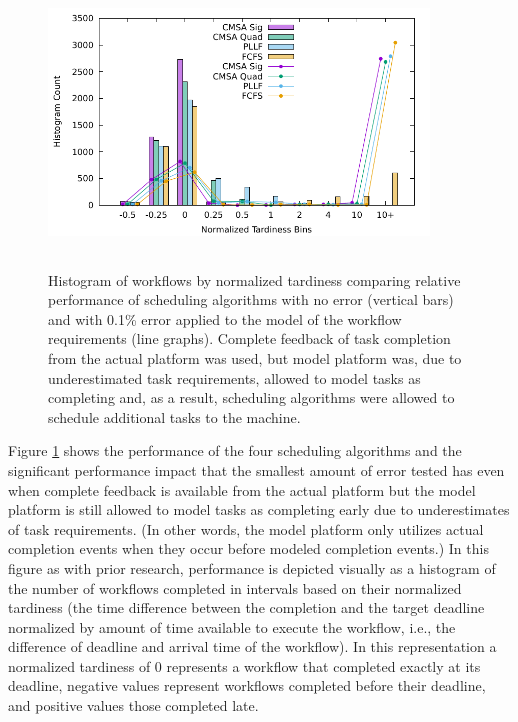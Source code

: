 \documentclass[10pt]{csce}
\begin{document}
\begin{figure}
	\begin{center}
		\includegraphics[width=0.9\textwidth,height=3in]{figures/Histogram_All_NoLoss_NoBias_LowAllError.pdf}
	\end{center}
	\caption{Histogram of workflows by normalized tardiness comparing
		relative performance of scheduling algorithms with no error (vertical
		bars) and with 0.1\% error applied to the model of the workflow
		requirements (line graphs).  Complete feedback of task completion from
		the actual platform was used, but model platform was, due to
		underestimated task requirements, allowed to model tasks as completing
		and, as a result, scheduling algorithms were allowed to schedule
		additional tasks to the machine.}
	\label{fig:noloss-nobias-lowerror}
\end{figure}

Figure \ref{fig:noloss-nobias-lowerror} shows the performance of the four
scheduling algorithms and the significant performance impact that the smallest
amount of error tested has even when complete feedback is available from the
actual platform but the model platform is still allowed to model tasks as
completing early due to underestimates of task requirements. (In other words,
the model platform only utilizes actual completion events when they occur
before modeled completion events.)  In this figure
as with prior research, performance is depicted visually as a histogram of the
number of workflows completed in intervals based on their normalized tardiness
(the time difference between the completion and the target deadline normalized
by amount of time available to execute the workflow, i.e., the difference of
deadline and arrival time of the workflow). In this representation a normalized
tardiness of 0 represents a workflow that completed exactly at its deadline,
negative values represent workflows completed before their deadline, and
positive values those completed late.
\end{document}
